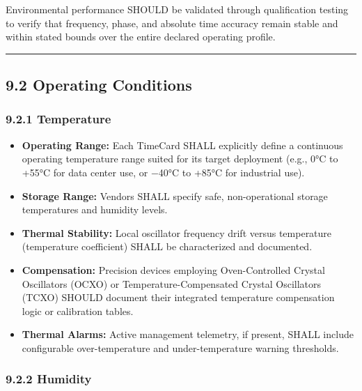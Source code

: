 \documentclass[
]{article}
\begin{document}
Environmental performance SHOULD be validated through qualification
testing to verify that frequency, phase, and absolute time accuracy
remain stable and within stated bounds over the entire declared
operating profile.

\begin{center}\rule{0.5\linewidth}{0.5pt}\end{center}

\subsection{9.2 Operating Conditions}\label{operating-conditions}

\subsubsection{9.2.1 Temperature}\label{temperature}

\begin{itemize}
\item
  \textbf{Operating Range:} Each TimeCard SHALL explicitly define a
  continuous operating temperature range suited for its target
  deployment (e.g., 0°C to +55°C for data center use, or −40°C to +85°C
  for industrial use).\\
\item
  \textbf{Storage Range:} Vendors SHALL specify safe, non-operational
  storage temperatures and humidity levels.\\
\item
  \textbf{Thermal Stability:} Local oscillator frequency drift versus
  temperature (temperature coefficient) SHALL be characterized and
  documented.\\
\item
  \textbf{Compensation:} Precision devices employing Oven-Controlled
  Crystal Oscillators (OCXO) or Temperature-Compensated Crystal
  Oscillators (TCXO) SHOULD document their integrated temperature
  compensation logic or calibration tables.\\
\item
  \textbf{Thermal Alarms:} Active management telemetry, if present,
  SHALL include configurable over-temperature and under-temperature
  warning thresholds.
\end{itemize}

\subsubsection{9.2.2 Humidity}\label{humidity}
\end{document}
